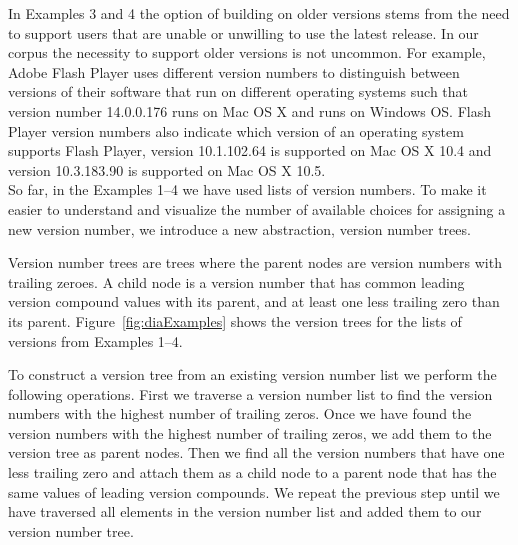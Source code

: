 \documentclass[conference]{IEEEtran}
\begin{document}



In Examples 3 and 4 the option of building on older versions stems from the need to support users that are unable or unwilling to use the latest release.
In our corpus the necessity to support older versions is not uncommon. 
For example, Adobe Flash Player uses different version numbers to distinguish between versions of their software that run on different operating systems such that version number 14.0.0.176 runs on Mac OS X and  runs on Windows OS.
Flash Player version numbers also indicate which version of an operating system supports Flash Player, version 10.1.102.64 is supported on Mac OS X 10.4 and version 10.3.183.90 is supported on Mac OS X 10.5.
\\

So far, in the Examples 1--4 we have used lists of version numbers. To make it easier to understand and visualize the number of available choices for assigning a new version number, we introduce a new abstraction, version number trees.

Version number trees are trees where the parent nodes are version numbers with trailing zeroes. A child node is a version number that has common leading version compound values with its parent, and at least one less trailing zero than its parent.
Figure~\ref{fig:diaExamples} shows the version trees for the lists of versions from Examples 1--4.

To construct a version tree from an existing version number list we perform the following operations.
First we traverse a version number list to find the version numbers with the highest number of trailing zeros.
Once we have found the version numbers with the highest number of trailing zeros, we add them to the version tree as parent nodes.
Then we find all the version numbers that have one less trailing zero and attach them as a child node to a parent node that has the same values of leading version compounds.
We repeat the previous step until we have traversed all elements in the version number list and added them to our version number tree. \\
\end{document}
